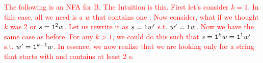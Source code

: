 \textcolor{red}{
The following is an NFA for B. The Intuition is this. First let's consider $k=1$. In this case, all we need is a $w$ that contains one . Now consider, what if we thought $k$ was 2 or $s=\texttt{1}^2w$. Let us rewrite it as $s=\texttt{1}w'$ s.t. $w'=\texttt{1}w$. Now we have the same case as before. For any $k > 1$, we could do this such that $s=\texttt{1}^kw=\texttt{1}^1w'$ s.t. $w' = \texttt{1}^{k-1}w$. In essence, we now realize that we are looking only for a string that starts with  and contains at least 2 s.
}
\begin{figure}[h]
\centering
{}
\end{figure}
